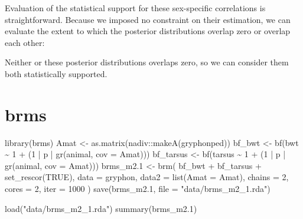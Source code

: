 \documentclass[
  12pt,
]{book}
\newenvironment{Shaded}{\begin{snugshade}}{\end{snugshade}}
\newcommand{\AttributeTok}[1]{\textcolor[rgb]{0.77,0.63,0.00}{#1}}
\newcommand{\ConstantTok}[1]{\textcolor[rgb]{0.00,0.00,0.00}{#1}}
\newcommand{\DecValTok}[1]{\textcolor[rgb]{0.00,0.00,0.81}{#1}}
\newcommand{\FloatTok}[1]{\textcolor[rgb]{0.00,0.00,0.81}{#1}}
\newcommand{\FunctionTok}[1]{\textcolor[rgb]{0.00,0.00,0.00}{#1}}
\newcommand{\NormalTok}[1]{#1}
\newcommand{\OtherTok}[1]{\textcolor[rgb]{0.56,0.35,0.01}{#1}}
\newcommand{\SpecialCharTok}[1]{\textcolor[rgb]{0.00,0.00,0.00}{#1}}
\newcommand{\StringTok}[1]{\textcolor[rgb]{0.31,0.60,0.02}{#1}}
\begin{document}
Evaluation of the statistical support for these sex-specific correlations is straightforward. Because we imposed no constraint on their estimation, we can evaluate the extent to which the posterior distributions overlap zero or overlap each other:

Neither or these posterior distributions overlaps zero, so we can consider them both statistically supported.

\hypertarget{brms-2}{%
\section{brms}\label{brms-2}}

\begin{Shaded}
\begin{Highlighting}[]
\FunctionTok{library}\NormalTok{(brms)}
\NormalTok{Amat }\OtherTok{\textless{}{-}} \FunctionTok{as.matrix}\NormalTok{(nadiv}\SpecialCharTok{::}\FunctionTok{makeA}\NormalTok{(gryphonped))}
\NormalTok{bf\_bwt }\OtherTok{\textless{}{-}} \FunctionTok{bf}\NormalTok{(bwt }\SpecialCharTok{\textasciitilde{}} \DecValTok{1} \SpecialCharTok{+}\NormalTok{ (}\DecValTok{1} \SpecialCharTok{|}\NormalTok{ p }\SpecialCharTok{|} \FunctionTok{gr}\NormalTok{(animal, }\AttributeTok{cov =}\NormalTok{ Amat)))}
\NormalTok{bf\_tarsus }\OtherTok{\textless{}{-}} \FunctionTok{bf}\NormalTok{(tarsus }\SpecialCharTok{\textasciitilde{}} \DecValTok{1} \SpecialCharTok{+}\NormalTok{ (}\DecValTok{1} \SpecialCharTok{|}\NormalTok{ p }\SpecialCharTok{|} \FunctionTok{gr}\NormalTok{(animal, }\AttributeTok{cov =}\NormalTok{ Amat)))}
\NormalTok{brms\_m2}\FloatTok{.1} \OtherTok{\textless{}{-}} \FunctionTok{brm}\NormalTok{(}
\NormalTok{  bf\_bwt }\SpecialCharTok{+}\NormalTok{ bf\_tarsus }\SpecialCharTok{+} \FunctionTok{set\_rescor}\NormalTok{(}\ConstantTok{TRUE}\NormalTok{),}
  \AttributeTok{data =}\NormalTok{ gryphon,}
  \AttributeTok{data2 =} \FunctionTok{list}\NormalTok{(}\AttributeTok{Amat =}\NormalTok{ Amat),}
  \AttributeTok{chains =} \DecValTok{2}\NormalTok{, }\AttributeTok{cores =} \DecValTok{2}\NormalTok{, }\AttributeTok{iter =} \DecValTok{1000}
\NormalTok{)}
\FunctionTok{save}\NormalTok{(brms\_m2}\FloatTok{.1}\NormalTok{, }\AttributeTok{file =} \StringTok{"data/brms\_m2\_1.rda"}\NormalTok{)}
\end{Highlighting}
\end{Shaded}

\begin{Shaded}
\begin{Highlighting}[]
\FunctionTok{load}\NormalTok{(}\StringTok{"data/brms\_m2\_1.rda"}\NormalTok{)}
\FunctionTok{summary}\NormalTok{(brms\_m2}\FloatTok{.1}\NormalTok{)}
\end{Highlighting}
\end{Shaded}
\end{document}
